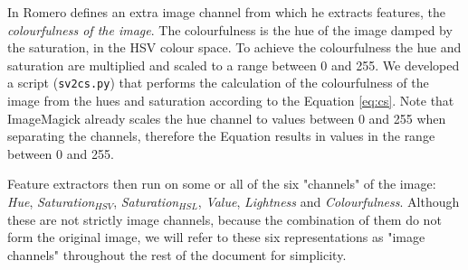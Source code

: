\documentclass[11pt,a4paper,twoside,openright,draft]{report}
\begin{document}
\begin{multicols}{2}
In \cite{rmc12ajs} Romero defines an extra image channel from which he extracts
features, the \emph{colourfulness of the image}.  The colourfulness is the hue
of the image damped by the saturation, in the HSV colour space.  To achieve the
colourfulness the hue and saturation are multiplied and scaled to a range
between 0 and 255.  We developed a script (\texttt{sv2cs.py}) that performs the
calculation of the colourfulness of the image from the hues and saturation
according to the Equation \ref{eq:cs}.  Note that ImageMagick already scales
the hue channel to values between 0 and 255 when separating the channels,
therefore the Equation results in values in the range between 0 and 255.

Feature extractors then run on some or all of the six "channels" of the image:
\emph{Hue}, \emph{Saturation$_{HSV}$}, \emph{Saturation$_{HSL}$}, \emph{Value},
\emph{Lightness} and \emph{Colourfulness}.  Although these are not strictly
image channels, because the combination of them do not form the original image,
we will refer to these six representations as "image channels" throughout the
rest of the document for simplicity.


\end{multicols}
\end{document}
